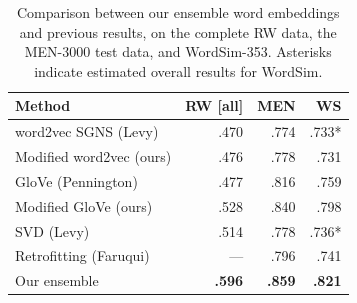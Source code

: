 \documentclass[11pt,letterpaper]{article}
\begin{document}
\begin{table}[t]
\centering
\footnotesize
\begin{tabular}{l|rrr}
\toprule
Method                        & RW [all]  &      MEN  & WS    \\
\midrule
word2vec SGNS (Levy)          &     .470  &     .774  & .733* \\
Modified word2vec (ours)      &     .476  &     .778  & .731  \\
GloVe (Pennington)            &     .477  &     .816  & .759  \\
Modified GloVe (ours)         &     .528  &     .840  & .798  \\
SVD (Levy)                    &     .514  &     .778  & .736* \\
Retrofitting (Faruqui)        &      ---  &     .796  & .741  \\
Our ensemble                  & \bf .596  & \bf .859  & \bf .821 \\
\bottomrule
\end{tabular}

\caption{
    Comparison between our ensemble word embeddings and previous results,
    on the complete RW data, the MEN-3000 test data, and WordSim-353.
    Asterisks indicate estimated overall results for WordSim.
}
\label{compare-others}
\end{table}
\end{document}
